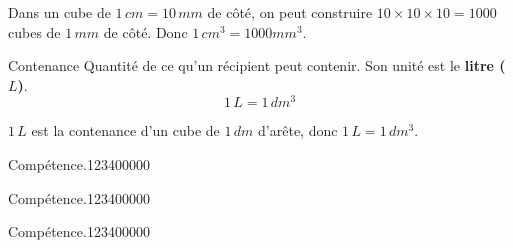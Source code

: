 \begin{pageCours}
\begin{Pp}
Dans un cube de $1\,cm=10\,mm$ de côté, on peut construire $10\times10\times10=1000$ cubes de $1\, mm$ de côté.
Donc $1 \,cm^3 = 1000 mm^3$.
\end{Pp}

\begin{DefT}{Contenance}
Quantité de ce qu'un récipient peut contenir. Son unité est le \textbf{litre ($L$)}.
\[1\,L=1\,dm^3\]
\end{DefT}

\begin{Pp}
$1\,L$ est la contenance d'un cube de $1\,dm$ d'arête,  donc $1\,L=1\,dm^3$.
\end{Pp}

\end{pageCours} %


\begin{pageAD}  %
\restoregeometry %


\begin{ExoCad}{Compétence.}{1234}{0}{0}{0}{0}{0}

\end{ExoCad}


\begin{ExoCad}{Compétence.}{1234}{0}{0}{0}{0}{0}

\end{ExoCad}


\begin{ExoCad}{Compétence.}{1234}{0}{0}{0}{0}{0}

\end{ExoCad}
 
\end{pageAD} %


